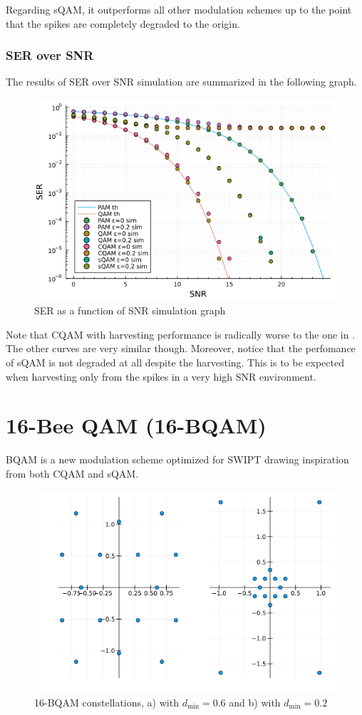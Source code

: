 \documentclass[11pt,a4paper,onecolumn,final]{article}
\newcommand{\dmin}{d_\text{min}}
\begin{document}
Regarding sQAM, it outperforms all other modulation schemes up to the point that the spikes are completely degraded to the origin. 

\newpage
\subsubsection*{SER over SNR}
The results of SER over SNR simulation are summarized in the following graph.  
\begin{figure}[h]
    \centering
    \includegraphics[scale=0.56]{ex2_b.png}
    \caption{SER as a function of SNR simulation graph}
\end{figure}

Note that CQAM with harvesting performance is radically worse to the one in \cite{cqam}. The other curves are very similar though. Moreover, notice that the perfomance of sQAM is not degraded at all despite the harvesting. This is to be expected when harvesting only from the spikes in a very high SNR environment. 

\section{16-Bee QAM (16-BQAM)}
BQAM is a new modulation scheme optimized for SWIPT drawing inspiration from both CQAM and sQAM. 
\begin{figure}[h]
    \centering
    \includegraphics[scale=0.57]{bqam_both.png}
    \caption{16-BQAM constellations, a) with \(\dmin = 0.6\) and b) with \(\dmin = 0.2\)}
\end{figure}
\end{document}

